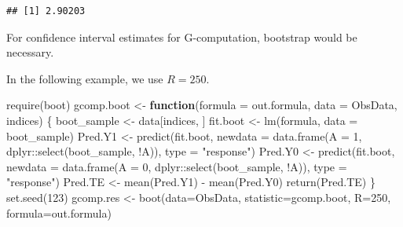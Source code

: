 \documentclass[
]{book}
\newenvironment{Shaded}{\begin{snugshade}}{\end{snugshade}}
\newcommand{\AttributeTok}[1]{\textcolor[rgb]{0.77,0.63,0.00}{#1}}
\newcommand{\ControlFlowTok}[1]{\textcolor[rgb]{0.13,0.29,0.53}{\textbf{#1}}}
\newcommand{\DecValTok}[1]{\textcolor[rgb]{0.00,0.00,0.81}{#1}}
\newcommand{\FunctionTok}[1]{\textcolor[rgb]{0.00,0.00,0.00}{#1}}
\newcommand{\NormalTok}[1]{#1}
\newcommand{\OtherTok}[1]{\textcolor[rgb]{0.56,0.35,0.01}{#1}}
\newcommand{\SpecialCharTok}[1]{\textcolor[rgb]{0.00,0.00,0.00}{#1}}
\newcommand{\StringTok}[1]{\textcolor[rgb]{0.31,0.60,0.02}{#1}}
\begin{document}
\begin{Shaded}
\end{Shaded}

\begin{verbatim}
## [1] 2.90203
\end{verbatim}

\begin{rmdcomment}
For confidence interval estimates for G-computation, bootstrap would be
necessary.
\end{rmdcomment}

In the following example, we use \(R = 250\).

\begin{Shaded}
\begin{Highlighting}[]
\FunctionTok{require}\NormalTok{(boot)}
\NormalTok{gcomp.boot }\OtherTok{\textless{}{-}} \ControlFlowTok{function}\NormalTok{(}\AttributeTok{formula =}\NormalTok{ out.formula, }\AttributeTok{data =}\NormalTok{ ObsData, indices) \{}
\NormalTok{  boot\_sample }\OtherTok{\textless{}{-}}\NormalTok{ data[indices, ]}
\NormalTok{  fit.boot }\OtherTok{\textless{}{-}} \FunctionTok{lm}\NormalTok{(formula, }\AttributeTok{data =}\NormalTok{ boot\_sample)}
\NormalTok{  Pred.Y1 }\OtherTok{\textless{}{-}} \FunctionTok{predict}\NormalTok{(fit.boot, }
                     \AttributeTok{newdata =} \FunctionTok{data.frame}\NormalTok{(}\AttributeTok{A =} \DecValTok{1}\NormalTok{, }
\NormalTok{                                          dplyr}\SpecialCharTok{::}\FunctionTok{select}\NormalTok{(boot\_sample, }\SpecialCharTok{!}\NormalTok{A)), }
                           \AttributeTok{type =} \StringTok{"response"}\NormalTok{)}
\NormalTok{  Pred.Y0 }\OtherTok{\textless{}{-}} \FunctionTok{predict}\NormalTok{(fit.boot, }
                     \AttributeTok{newdata =} \FunctionTok{data.frame}\NormalTok{(}\AttributeTok{A =} \DecValTok{0}\NormalTok{, }
\NormalTok{                                          dplyr}\SpecialCharTok{::}\FunctionTok{select}\NormalTok{(boot\_sample, }\SpecialCharTok{!}\NormalTok{A)), }
                           \AttributeTok{type =} \StringTok{"response"}\NormalTok{)}
\NormalTok{  Pred.TE }\OtherTok{\textless{}{-}} \FunctionTok{mean}\NormalTok{(Pred.Y1) }\SpecialCharTok{{-}} \FunctionTok{mean}\NormalTok{(Pred.Y0)}
  \FunctionTok{return}\NormalTok{(Pred.TE)}
\NormalTok{\}}
\FunctionTok{set.seed}\NormalTok{(}\DecValTok{123}\NormalTok{)}
\NormalTok{gcomp.res }\OtherTok{\textless{}{-}} \FunctionTok{boot}\NormalTok{(}\AttributeTok{data=}\NormalTok{ObsData, }
                  \AttributeTok{statistic=}\NormalTok{gcomp.boot,}
                  \AttributeTok{R=}\DecValTok{250}\NormalTok{, }
                  \AttributeTok{formula=}\NormalTok{out.formula)}
\end{Highlighting}
\end{Shaded}
\end{document}
